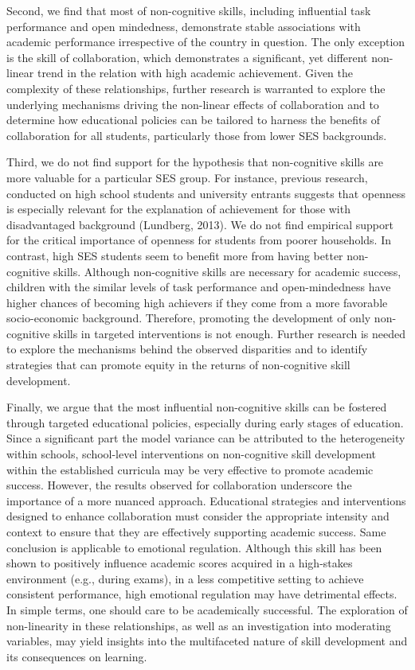 \documentclass{article}
\begin{document}
Second, we find that most of non-cognitive skills, including influential
task performance and open mindedness, demonstrate stable associations
with academic performance irrespective of the country in question. The
only exception is the skill of collaboration, which demonstrates a
significant, yet different non-linear trend in the relation with high
academic achievement. Given the complexity of these relationships,
further research is warranted to explore the underlying mechanisms
driving the non-linear effects of collaboration and to determine how
educational policies can be tailored to harness the benefits of
collaboration for all students, particularly those from lower SES
backgrounds.

Third, we do not find support for the hypothesis that non-cognitive
skills are more valuable for a particular SES group. For instance,
previous research, conducted on high school students and university
entrants suggests that openness is especially relevant for the
explanation of achievement for those with disadvantaged background
(Lundberg, 2013). We do not find empirical support for the critical
importance of openness for students from poorer households. In contrast,
high SES students seem to benefit more from having better non-cognitive
skills. Although non-cognitive skills are necessary for academic
success, children with the similar levels of task performance and
open-mindedness have higher chances of becoming high achievers if they
come from a more favorable socio-economic background. Therefore,
promoting the development of only non-cognitive skills in targeted
interventions is not enough. Further research is needed to explore the
mechanisms behind the observed disparities and to identify strategies
that can promote equity in the returns of non-cognitive skill
development.

Finally, we argue that the most influential non-cognitive skills can be
fostered through targeted educational policies, especially during early
stages of education. Since a significant part the model variance can be
attributed to the heterogeneity within schools, school-level
interventions on non-cognitive skill development within the established
curricula may be very effective to promote academic success. However,
the results observed for collaboration underscore the importance of a
more nuanced approach. Educational strategies and interventions designed
to enhance collaboration must consider the appropriate intensity and
context to ensure that they are effectively supporting academic success.
Same conclusion is applicable to emotional regulation. Although this
skill has been shown to positively influence academic scores acquired in
a high-stakes environment (e.g., during exams), in a less competitive
setting to achieve consistent performance, high emotional regulation may
have detrimental effects. In simple terms, one should care to be
academically successful. The exploration of non-linearity in these
relationships, as well as an investigation into moderating variables,
may yield insights into the multifaceted nature of skill development and
its consequences on learning.
\end{document}
